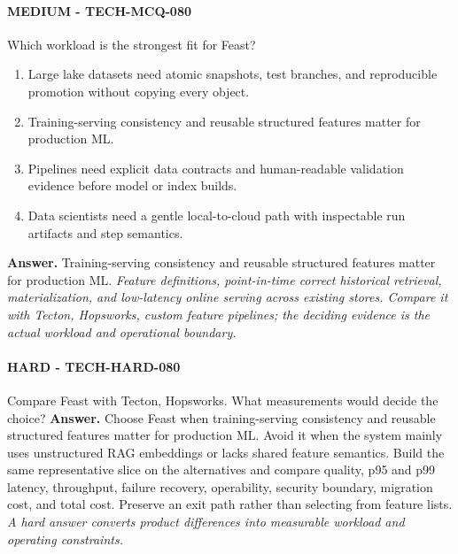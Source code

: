 \paragraph{MEDIUM - TECH-MCQ-080} Which workload is the strongest fit for Feast?
\begin{enumerate}[label=\Alph*.]
\item Large lake datasets need atomic snapshots, test branches, and reproducible promotion without copying every object.
\item Training-serving consistency and reusable structured features matter for production ML.
\item Pipelines need explicit data contracts and human-readable validation evidence before model or index builds.
\item Data scientists need a gentle local-to-cloud path with inspectable run artifacts and step semantics.
\end{enumerate}
\textbf{Answer.} Training-serving consistency and reusable structured features matter for production ML.
\textit{Feature definitions, point-in-time correct historical retrieval, materialization, and low-latency online serving across existing stores. Compare it with Tecton, Hopsworks, custom feature pipelines; the deciding evidence is the actual workload and operational boundary.}
\paragraph{HARD - TECH-HARD-080} Compare Feast with Tecton, Hopsworks. What measurements would decide the choice?
\textbf{Answer.} Choose Feast when training-serving consistency and reusable structured features matter for production ML. Avoid it when the system mainly uses unstructured RAG embeddings or lacks shared feature semantics. Build the same representative slice on the alternatives and compare quality, p95 and p99 latency, throughput, failure recovery, operability, security boundary, migration cost, and total cost. Preserve an exit path rather than selecting from feature lists.
\textit{A hard answer converts product differences into measurable workload and operating constraints.}
